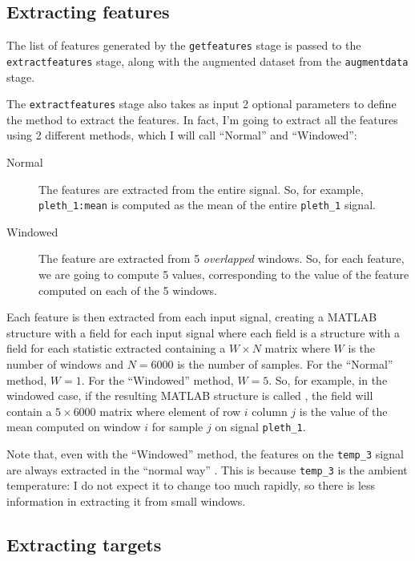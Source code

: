 \subsection{Extracting features}\label{subsec:extractfeaturesstage}

The list of features generated by the \texttt{getfeatures} stage is passed to
the \texttt{extractfeatures} stage, along with the augmented dataset from the
\texttt{augmentdata} stage.

The \texttt{extractfeatures} stage also takes as input 2 optional parameters to
define the method to extract the features. In fact, I'm going to extract all
the features using 2 different methods, which I will call ``Normal'' and
``Windowed'':
\begin{description}
\item[Normal] The features are extracted from the entire signal. So, for
	example, \texttt{pleth\_1:mean} is computed as the mean of the entire
	\texttt{pleth\_1} signal.
\item[Windowed] The feature are extracted from 5 \emph{overlapped} windows. So,
	for each feature, we are going to compute 5 values, corresponding to
	the value of the feature computed on each of the 5 windows.
\end{description}

Each feature is then extracted from each input signal, creating a MATLAB
structure with a field for each input signal where each field is a structure
with a field for each statistic extracted containing a \(W \times N\) matrix
where \(W\) is the number of windows and \(N = 6000\) is the number of samples.
For the ``Normal'' method, \(W = 1\). For the ``Windowed'' method, \(W = 5\).
So, for example, in the windowed case, if the resulting MATLAB structure is
called , the field  will contain a
\(5 \times 6000\) matrix where element of row \(i\) column \(j\) is the value
of the mean computed on window \(i\) for sample \(j\) on signal
\texttt{pleth\_1}.

Note that, even with the ``Windowed'' method, the features on the
\texttt{temp\_3} signal are always extracted in the ``normal way'' . This is because \texttt{temp\_3} is the ambient temperature: I
do not expect it to change too much rapidly, so there is less information in
extracting it from small windows.

\subsection{Extracting targets}\label{subsec:extracttargetsstage}

